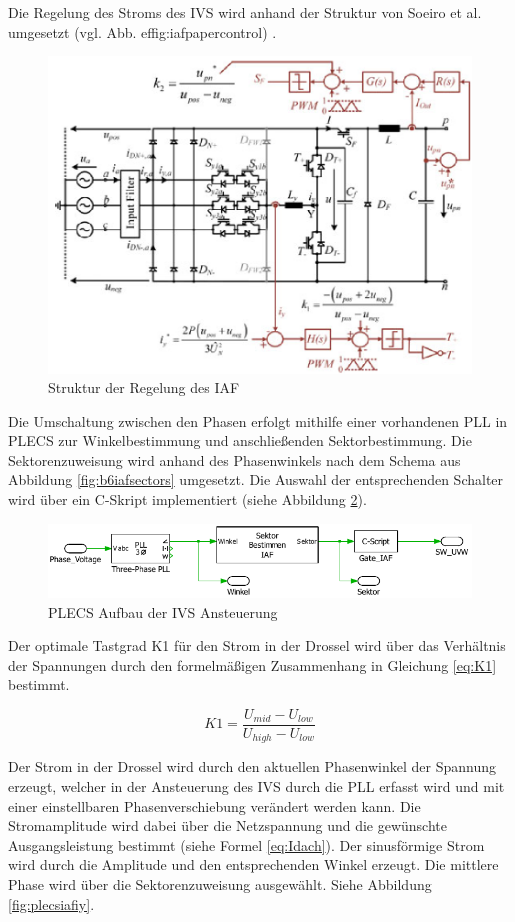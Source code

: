 		
		Die Regelung des Stroms des IVS wird anhand der Struktur von Soeiro et al. umgesetzt (vgl. Abb. ef{fig:iafpapercontrol}) \cite{Soeiro.2013}. 
		 \begin{figure}[H]
			\centering
			\includegraphics[width=0.7\linewidth]{content/Grafiken/IAF_Paper_Control}
			\caption{Struktur der Regelung des IAF \cite{Soeiro.2013}}
			\label{fig:iafpapercontrol}
		\end{figure}
		Die Umschaltung zwischen den Phasen erfolgt mithilfe einer vorhandenen PLL in PLECS zur Winkelbestimmung und anschließenden Sektorbestimmung. Die Sektorenzuweisung wird anhand des Phasenwinkels nach dem Schema aus Abbildung \ref{fig:b6iafsectors} umgesetzt. Die Auswahl der entsprechenden Schalter wird über ein C-Skript implementiert (siehe Abbildung \ref{fig:plecsiafivscontrol}). 
		\begin{figure}[H]
			\centering
			\includegraphics[width=1\linewidth]{content/Grafiken/PlecsIAFivscontrol}
			\caption{PLECS Aufbau der \gls{IVS} Ansteuerung}
			\label{fig:plecsiafivscontrol}
		\end{figure}
		Der optimale Tastgrad K1 für den Strom in der Drossel wird über das Verhältnis der Spannungen durch den formelmäßigen Zusammenhang in Gleichung \ref{eq:K1} bestimmt. 
		

		
		\begin{equation}
			\label{eq:K1}
			K1 = \dfrac{U_{mid}- U_{low}}{U_{high} -U_{low}} 
		\end{equation}
		
			Der Strom in der Drossel wird durch den aktuellen Phasenwinkel der Spannung erzeugt, welcher in der Ansteuerung des IVS durch die PLL erfasst wird und mit einer einstellbaren Phasenverschiebung verändert werden kann. Die Stromamplitude wird dabei über die Netzspannung und die gewünschte Ausgangsleistung bestimmt (siehe Formel \ref{eq:Idach}). Der sinusförmige Strom wird durch die Amplitude und den entsprechenden Winkel erzeugt. Die mittlere Phase wird über die Sektorenzuweisung ausgewählt. Siehe Abbildung \ref{fig:plecsiafiy}. 
		
